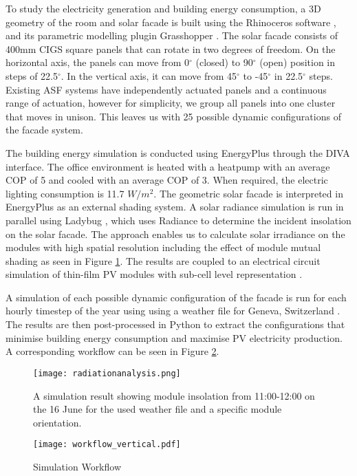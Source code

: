 
To study the electricity generation and building energy consumption, a 3D geometry of the room and solar facade is built using the Rhinoceros software \cite{Rhino}, and its parametric modelling plugin Grasshopper \cite{grasshopper}. The solar facade consists of 400mm CIGS square panels that can rotate in two degrees of freedom. On the horizontal axis, the panels can move from 0$^{\circ}$ (closed) to 90$^{\circ}$ (open) position in steps of 22.5$^{\circ}$. In the vertical axis, it can move from 45$^{\circ}$ to -45$^{\circ}$ in 22.5$^{\circ}$ steps. Existing ASF systems \cite{nagy2015frontiers} have independently actuated panels and a continuous range of actuation, however for simplicity, we group all panels into one cluster that moves in unison. This leaves us with 25 possible dynamic configurations of the facade system. 

The building energy simulation is conducted using EnergyPlus \cite{energyplus} through the DIVA \cite{DIVA} interface. The office environment is heated with a heatpump with an average COP of 5 and cooled with an average COP of 3. When required, the electric lighting consumption is 11.7 $W/m^2$.  The geometric solar facade is interpreted in EnergyPlus as an external shading system. A solar radiance simulation is run in parallel using Ladybug \cite{roudsari2014ladybug},  which uses Radiance \cite{ward1994radiance} to determine the incident insolation on the solar facade. The approach enables us to calculate solar irradiance on the modules with high spatial resolution including the effect of module mutual shading as seen in Figure \ref{fig:radiation}. The results are coupled to an electrical circuit simulation of thin-film PV modules with sub-cell level representation \cite{hofer2015PVSEC}.

A simulation of each possible dynamic configuration of the facade is run for each hourly timestep of the year using using a weather file for Geneva, Switzerland \cite{genevaweatherfile}. The results are then post-processed in Python \cite{python} to extract the configurations that minimise building energy consumption and maximise PV electricity production. A corresponding workflow can be seen in Figure \ref{fig:workflow}. 



\begin{figure}[H]
\begin{center}
\texttt{[image: radiationanalysis.png]}
\caption{A simulation result showing module insolation from 11:00-12:00 on the 16 June for the used weather file and a specific module orientation.}
\label{fig:radiation}
\end{center}
\end{figure}


\begin{figure}
\begin{center}
\texttt{[image: workflow\_vertical.pdf]}
\caption{Simulation Workflow}
\label{fig:workflow}
\end{center}
\end{figure}